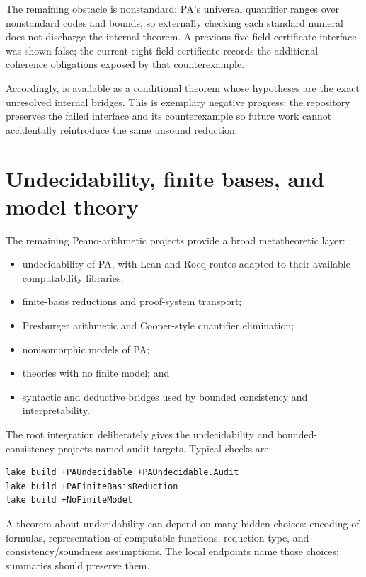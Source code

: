 \documentclass[
  10pt,
  a4paper,
  twoside,
  open=any,
  parskip=half,
  headings=big
]{scrreprt}
\newcommand{\code}[1]{\texttt{\detokenize{#1}}}
\begin{document}
The remaining obstacle is nonstandard: PA's universal quantifier ranges over nonstandard codes and bounds, so externally checking each standard numeral does not discharge the internal theorem. A previous five-field certificate interface was shown false; the current eight-field certificate records the additional coherence obligations exposed by that counterexample.

Accordingly, \code{paUniformZFCProvabilitySentence} is available as a conditional theorem whose hypotheses are the exact unresolved internal bridges. This is exemplary negative progress: the repository preserves the failed interface and its counterexample so future work cannot accidentally reintroduce the same unsound reduction.

\section{Undecidability, finite bases, and model theory}
\label{sec:pa-undecidability}

The remaining Peano-arithmetic projects provide a broad metatheoretic layer:

\begin{itemize}
  \item undecidability of PA, with Lean and Rocq routes adapted to their available computability libraries;
  \item finite-basis reductions and proof-system transport;
  \item Presburger arithmetic and Cooper-style quantifier elimination;
  \item nonisomorphic models of PA;
  \item theories with no finite model; and
  \item syntactic and deductive bridges used by bounded consistency and interpretability.
\end{itemize}

The root integration deliberately gives the undecidability and bounded-consistency projects named audit targets. Typical checks are:

\begin{lstlisting}[language=bash]
lake build +PAUndecidable +PAUndecidable.Audit
lake build +PAFiniteBasisReduction
lake build +NoFiniteModel
\end{lstlisting}

A theorem about undecidability can depend on many hidden choices: encoding of formulas, representation of computable functions, reduction type, and consistency/soundness assumptions. The local endpoints name those choices; summaries should preserve them.
\end{document}
